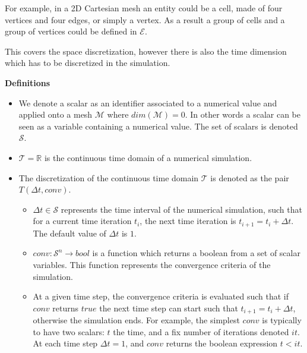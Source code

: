 For example, in a 2D Cartesian mesh an entity could be a cell, made of four vertices and four edges, or simply a vertex. As a result a group of cells and a group of vertices could be defined in $\mathcal{E}$. %

\medskip
This covers the space discretization, however there is also the time dimension which has to be discretized in the simulation.

\medskip
\noindent \textbf{Definitions}
\begin{itemize}
\item We denote a scalar as an identifier associated to a numerical value and applied onto a mesh $\mathcal{M}$ where $dim(\mathcal{M})=0$. In other words a scalar can be seen as a variable containing a numerical value. The set of scalars is denoted $\mathcal{S}$.
\item $\mathcal{T}=\mathbb{R}$ is the continuous time domain of a numerical simulation.
\item The discretization of the continuous time domain $\mathcal{T}$ is denoted as the pair $T(\Delta t,conv)$.
\begin{itemize}
\item $\Delta t \in \mathcal{S}$ represents the time interval of the numerical simulation, such that for a current time iteration $t_i$, the next time iteration is $t_{i+1} = t_i + \Delta t$. The default value of $\Delta t$ is $1$.
\item $conv:\mathcal{S}^n \rightarrow bool$ is a function which returns a boolean from a set of scalar variables. This function represents the convergence criteria of the simulation. 
\item At a given time step, the convergence criteria is evaluated such that if $conv$ returns $true$ the next time step can start such that $t_{i+1} = t_i + \Delta t$, otherwise the simulation ends. For example, the simplest $conv$ is typically to have two scalars: $t$ the time, and a fix number of iterations denoted $it$. At each time step $\Delta t=1$, and $conv$ returns the boolean expression $t<it$.
\end{itemize}
\end{itemize}


